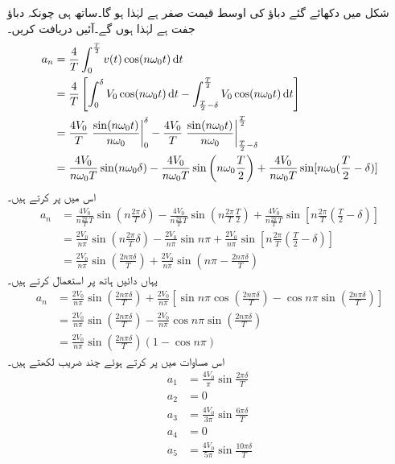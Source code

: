 شکل میں دکھائے گئے دباؤ کی اوسط قیمت صفر ہے لہٰذا  ہو گا۔ساتھ ہی چونکہ دباؤ جفت ہے لہٰذا  ہوں گے۔آئیں  دریافت کریں۔
\begin{align*}
a_n&=\frac{4}{T}\int_0^{\frac{T}{2}} v(t)\cos (n\omega_0 t)\dif t\\
&=\frac{4}{T}\left[\int_0^{\delta} V_0\cos(n\omega_0 t) \dif t-\int_{\frac{T}{2}-\delta}^{\frac{T}{2}}V_0 \cos(n\omega_0 t)\dif t\right]\\
&=\frac{4V_0}{T}\left. \frac{\sin(n\omega_0 t)}{n\omega_0}\right|_{0}^{\delta}-\frac{4V_0}{T}\left. \frac{\sin(n\omega_0 t)}{n\omega_0}\right|_{\frac{T}{2}-\delta}^{\frac{T}{2}}\\
&=\frac{4V_0}{n\omega_0 T}\sin(n\omega_0 \delta)-\frac{4V_0}{n\omega_0 T}\sin\left(n\omega_0 \frac{T}{2}\right)+\frac{4V_0}{n\omega_0 T}\sin[n\omega_0 (\frac{T}{2}-\delta)]
\end{align*}
اس میں  پر کرتے ہیں۔
\begin{align*}
a_n&=\frac{4V_0}{n\frac{2\pi}{T} T}\sin(n\frac{2\pi}{T}\delta)-\frac{4V_0}{n\frac{2\pi}{T} T}\sin\left(n\frac{2\pi}{T} \frac{T}{2}\right)+\frac{4V_0}{n\frac{2\pi}{T} T}\sin[n\frac{2\pi}{T} (\frac{T}{2}-\delta)]\\
&=\frac{2V_0}{n\pi}\sin(n\frac{2\pi}{T}\delta)-\frac{2V_0}{n\pi}\sin n\pi+\frac{2V_0}{n\pi}\sin[n\frac{2\pi}{T} (\frac{T}{2}-\delta)]\\
&=\frac{2V_0}{n\pi}\sin\left(\frac{2n\pi\delta}{T}\right)+\frac{2V_0}{n\pi}\sin\left(n\pi-\frac{2n\pi\delta}{T}\right)
\end{align*}
یہاں دائیں ہاتھ پر  استعمال کرتے ہیں۔
\begin{align*}
a_n&=\frac{2V_0}{n\pi}\sin\left(\frac{2n\pi\delta}{T}\right)+\frac{2V_0}{n\pi}\left[\sin n\pi \cos(\frac{2n\pi\delta}{T})-\cos n\pi \sin(\frac{2n\pi\delta}{T})\right]\\
&=\frac{2V_0}{n\pi}\sin\left(\frac{2n\pi\delta}{T}\right)-\frac{2V_0}{n\pi}\cos n\pi \sin(\frac{2n\pi\delta}{T})\\
&=\frac{2V_0}{n\pi}\sin\left(\frac{2n\pi\delta}{T}\right)(1-\cos n\pi)
\end{align*}
اس مساوات میں  پر کرتے ہوئے چند  ضریب  لکھتے ہیں۔
\begin{align*}
a_1&=\frac{4V_0}{\pi}\sin\frac{2\pi\delta}{T}\\
a_2&=0\\
a_3&=\frac{4V_0}{3\pi}\sin\frac{6\pi\delta}{T}\\
a_4&=0\\
a_5&=\frac{4V_0}{5\pi}\sin\frac{10\pi\delta}{T}
\end{align*}

